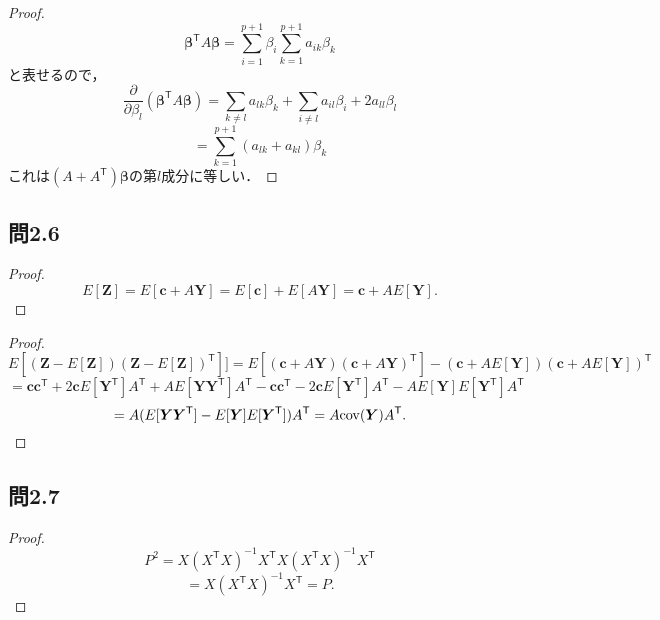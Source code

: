 \documentclass[pdflatex,ja=standard]{bxjsarticle}
\begin{document}
\begin{proof}
\begin{equation}
\bm{\beta}^{\mathsf{T}} A \bm{\beta} =  \sum_{i=1}^{p+1} \beta_i \sum_{k=1}^{p+1} a_{ik} \beta_k
\end{equation}
と表せるので，
\begin{equation}
\frac{\partial}{\partial \beta_l} \left( \bm{\beta}^{\mathsf{T}} A \bm{\beta} \right) = \sum_{k \neq l} a_{lk} \beta_k + \sum_{i \neq l} a_{il} \beta_i + 2 a_{ll} \beta_l
\end{equation}
\begin{equation}
= \sum_{k=1}^{p+1} (a_{lk} + a_{kl}) \beta_k
\end{equation}
これは$(A + A^{\mathsf{T}}) \bm{\beta}$の第$l$成分に等しい．
\end{proof}

\subsection{問2.6}
\begin{proof}
\begin{equation}
E[\bm{Z}] = E[\bm{c} + A \bm{Y}] = E[\bm{c}] + E[A\bm{Y}] = \bm{c} + A E[\bm{Y}].
\end{equation}
\end{proof}

\begin{proof}
\begin{equation}
E[(\bm{Z} - E[\bm{Z}])(\bm{Z} - E[\bm{Z}])^{\mathsf{T}}]] = E[(\bm{c} + A\bm{Y})(\bm{c} + A\bm{Y})^{\mathsf{T}}] - (\bm{c} + A E[\bm{Y}])(\bm{c} + A E[\bm{Y}])^{\mathsf{T}}
\end{equation}
\begin{equation}
= \bm{c} \bm{c}^{\mathsf{T}} + 2 \bm{c} E[\bm{Y}^{\mathsf{T}}] A^{\mathsf{T}} + A E[ \bm{Y} \bm{Y}^{\mathsf{T}}] A^{\mathsf{T}} - \bm{c} \bm{c}^{\mathsf{T}} - 2 \bm{c} E[\bm{Y}^{\mathsf{T}}] A^{\mathsf{T}} -  A E[ \bm{Y}] E[ \bm{Y}^{\mathsf{T}}] A^{\mathsf{T}} 
\end{equation}
\begin{equation}
= A(E[\bm{Y}\bm{Y}^{\mathsf{T}}] - E[\bm{Y}]E[\bm{Y}^{\mathsf{T}}])A^{\mathsf{T}} = A {\rm cov} (\bm{Y}) A^{\mathsf{T}}.
\end{equation}

\end{proof}

\subsection{問2.7}
\begin{proof}
\begin{equation}
P^2 = X (X^{\mathsf{T}} X )^{-1} X^{\mathsf{T}} X (X^{\mathsf{T}} X )^{-1} X^{\mathsf{T}}
\end{equation}
\begin{equation}
= X (X^{\mathsf{T}} X )^{-1} X^{\mathsf{T}} = P.
\end{equation}
\end{proof}
\end{document}
